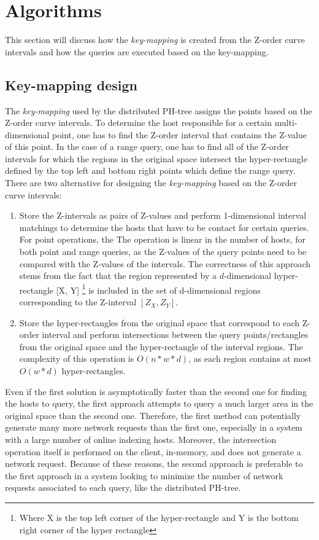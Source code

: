 \documentclass[11pt,a4paper]{globis-book}
\begin{document}
\section{Algorithms}
\label{sec:distindex-algorithms}

This section will discuss how the \textit{key-mapping} is created from the Z-order curve intervals and how the queries are executed based on the key-mapping. 
\subsection{Key-mapping design}

\label{sec:distindex-key-mapping}
The \textit{key-mapping} used by the distributed PH-tree assigns the points based on the Z-order curve intervals. To determine the host responsible for a certain multi-dimensional point, one has to find the Z-order interval that contains the Z-value of this point. In the case of a range query, one has to find all of the Z-order intervals for which the regions in the original space intersect the hyper-rectangle defined by the top left and bottom right points which define the range query. There are two alternative for designing the \textit{key-mapping} based on the Z-order curve intervals:
\begin{enumerate}
    \item Store the Z-intervals as pairs of Z-values and perform 1-dimensional interval matchings to determine the hosts that have to be contact for certain queries. For point operations, the The operation is linear in the number of hosts, for both point and range queries, as the Z-values of the query points need to be compared with the Z-values of the intervals. The correctness of this approach stems from the fact that the region represented by a $d$-dimensional hyper-rectangle [X, Y] \footnote{Where X is the top left corner of the hyper-rectangle and Y is the bottom right corner of the hyper rectangle} is included in the set of d-dimensional regions corresponding to the Z-interval $[Z_X,Z_Y]$.
    \item Store the hyper-rectangles from the original space that correspond to each Z-order interval and perform intersections between the query points/rectangles from the original space and the hyper-rectangle of the interval regions. The complexity of this operation is $O(n * w * d)$, as each region contains at most $O(w * d)$ hyper-rectangles. 
\end{enumerate}

Even if the first solution is asymptotically faster than the second one for finding the hosts to query, the first approach attempts to query a much larger area in the original space than the second one. Therefore, the first method can potentially generate many more network requests than the first one, especially in a system with a large number of online indexing hosts. Moreover, the intersection operation itself is performed on the client, in-memory, and does not generate a network request. Because of these reasons, the second approach is preferable to the first approach in a system looking to minimize the number of network requests associated to each query, like the distributed PH-tree. 
\end{document}
